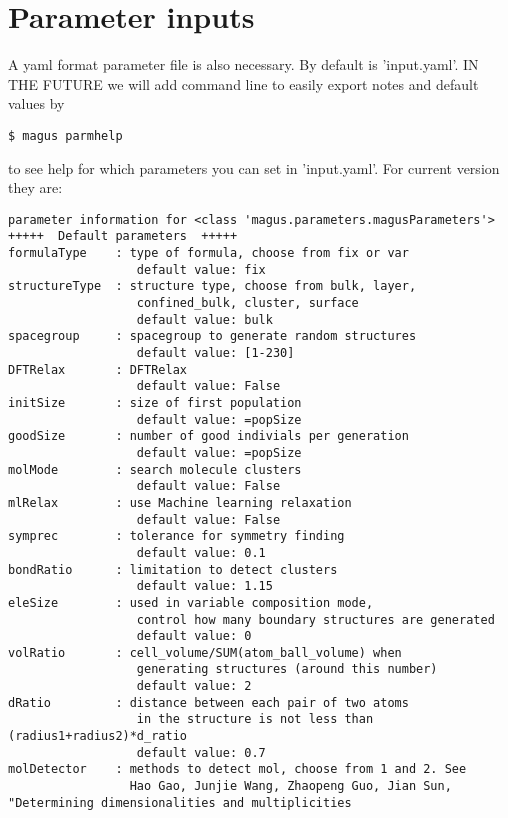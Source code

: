 \documentclass[12pt,oneside]{book}
\begin{document}
\section{Parameter inputs}
A yaml format parameter file is also necessary. By default is 'input.yaml'. IN THE FUTURE we will add command line to easily export notes and default values by
\begin{tcolorbox}
    \begin{verbatim}
$ magus parmhelp
    \end{verbatim}
\end{tcolorbox}
to see help for which parameters you can set in 'input.yaml'. For current version they are:
\begin{tcolorbox}
    \begin{verbatim}
parameter information for <class 'magus.parameters.magusParameters'>
+++++  Default parameters  +++++
formulaType    : type of formula, choose from fix or var
                  default value: fix
structureType  : structure type, choose from bulk, layer, 
                  confined_bulk, cluster, surface
                  default value: bulk
spacegroup     : spacegroup to generate random structures
                  default value: [1-230]
DFTRelax       : DFTRelax
                  default value: False
initSize       : size of first population
                  default value: =popSize
goodSize       : number of good indivials per generation
                  default value: =popSize
molMode        : search molecule clusters
                  default value: False
mlRelax        : use Machine learning relaxation
                  default value: False
symprec        : tolerance for symmetry finding
                  default value: 0.1
bondRatio      : limitation to detect clusters
                  default value: 1.15
eleSize        : used in variable composition mode, 
                  control how many boundary structures are generated
                  default value: 0
volRatio       : cell_volume/SUM(atom_ball_volume) when
                  generating structures (around this number)
                  default value: 2
dRatio         : distance between each pair of two atoms
                  in the structure is not less than (radius1+radius2)*d_ratio
                  default value: 0.7
molDetector    : methods to detect mol, choose from 1 and 2. See
                 Hao Gao, Junjie Wang, Zhaopeng Guo, Jian Sun, "Determining dimensionalities and multiplicities

\end{verbatim}
\end{tcolorbox}
\end{document}
